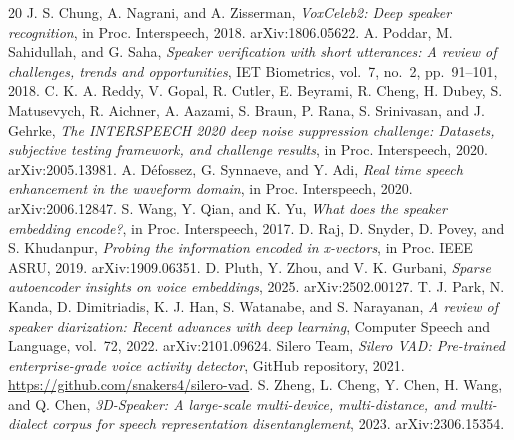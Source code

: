 \documentclass{llncs}
\begin{document}
\begin{thebibliography}{20}
 J. S. Chung, A. Nagrani, and A. Zisserman, \emph{VoxCeleb2: Deep speaker recognition}, in Proc. Interspeech, 2018. arXiv:1806.05622.
 A. Poddar, M. Sahidullah, and G. Saha, \emph{Speaker verification with short utterances: A review of challenges, trends and opportunities}, IET Biometrics, vol.~7, no.~2, pp.~91--101, 2018.
 C. K. A. Reddy, V. Gopal, R. Cutler, E. Beyrami, R. Cheng, H. Dubey, S. Matusevych, R. Aichner, A. Aazami, S. Braun, P. Rana, S. Srinivasan, and J. Gehrke, \emph{The INTERSPEECH 2020 deep noise suppression challenge: Datasets, subjective testing framework, and challenge results}, in Proc. Interspeech, 2020. arXiv:2005.13981.
 A. D\'efossez, G. Synnaeve, and Y. Adi, \emph{Real time speech enhancement in the waveform domain}, in Proc. Interspeech, 2020. arXiv:2006.12847.
 S. Wang, Y. Qian, and K. Yu, \emph{What does the speaker embedding encode?}, in Proc. Interspeech, 2017.
 D. Raj, D. Snyder, D. Povey, and S. Khudanpur, \emph{Probing the information encoded in x-vectors}, in Proc. IEEE ASRU, 2019. arXiv:1909.06351.
 D. Pluth, Y. Zhou, and V. K. Gurbani, \emph{Sparse autoencoder insights on voice embeddings}, 2025. arXiv:2502.00127.
 T. J. Park, N. Kanda, D. Dimitriadis, K. J. Han, S. Watanabe, and S. Narayanan, \emph{A review of speaker diarization: Recent advances with deep learning}, Computer Speech and Language, vol.~72, 2022. arXiv:2101.09624.
 Silero Team, \emph{Silero VAD: Pre-trained enterprise-grade voice activity detector}, GitHub repository, 2021. \url{https://github.com/snakers4/silero-vad}.
 S. Zheng, L. Cheng, Y. Chen, H. Wang, and Q. Chen, \emph{3D-Speaker: A large-scale multi-device, multi-distance, and multi-dialect corpus for speech representation disentanglement}, 2023. arXiv:2306.15354.
\end{thebibliography}
\end{document}
